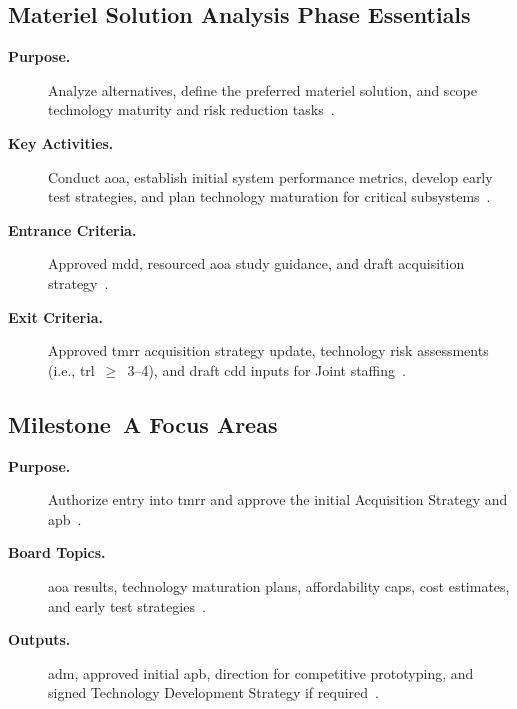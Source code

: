 \documentclass[../main.tex]{subfiles}
\begin{document}
\subsection{Materiel Solution Analysis Phase Essentials}
\begin{description}
	\item[\textbf{Purpose.}] Analyze alternatives, define the preferred materiel solution, and scope technology maturity and risk reduction tasks~\autocite{DoDI5000-85}.
	\item[\textbf{Key Activities.}] Conduct \ac{aoa}, establish initial system performance metrics, develop early test strategies, and plan technology maturation for critical subsystems~\autocite{DoDI5000-85}.
	\item[\textbf{Entrance Criteria.}] Approved \ac{mdd}, resourced \ac{aoa} study guidance, and draft acquisition strategy~\autocite{DoDI5000-02}.
	\item[\textbf{Exit Criteria.}] Approved \ac{tmrr} acquisition strategy update, technology risk assessments (i.e., \ac{trl}~$\geq$~3--4), and draft \ac{cdd} inputs for Joint staffing~\autocite{DoDI5000-85}.
\end{description}

\subsection{Milestone~A Focus Areas}
\begin{description}
	\item[\textbf{Purpose.}] Authorize entry into \ac{tmrr} and approve the initial Acquisition Strategy and \ac{apb}~\autocite{DoDI5000-85}.
	\item[\textbf{Board Topics.}] \ac{aoa} results, technology maturation plans, affordability caps, cost estimates, and early test strategies~\autocite{DoDI5000-85}.
	\item[\textbf{Outputs.}] \ac{adm}, approved initial \ac{apb}, direction for competitive prototyping, and signed Technology Development Strategy if required~\autocite{DoDI5000-85}.
\end{description}
\end{document}
